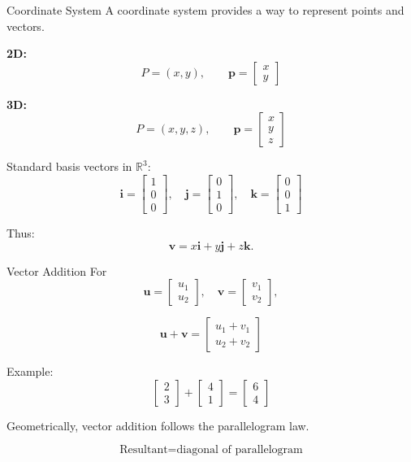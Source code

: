 \documentclass[aspectratio=169]{beamer}
\begin{document}
\begin{frame}{Coordinate System}
A coordinate system provides a way to represent points and vectors.

\textbf{2D:}
\[
P=(x,y),\qquad
\mathbf p=\begin{bmatrix}x\\y\end{bmatrix}
\]

\textbf{3D:}
\[
P=(x,y,z),\qquad
\mathbf p=
\begin{bmatrix}x\\y\\z\end{bmatrix}
\]

Standard basis vectors in $\mathbb R^3$:
\[
\mathbf i=\begin{bmatrix}1\\0\\0\end{bmatrix},
\quad
\mathbf j=\begin{bmatrix}0\\1\\0\end{bmatrix},
\quad
\mathbf k=\begin{bmatrix}0\\0\\1\end{bmatrix}
\]

Thus:
\[
\mathbf v=x\mathbf i+y\mathbf j+z\mathbf k.
\]
\end{frame}

\begin{frame}{Vector Addition}
For
\[
\mathbf u=\begin{bmatrix}u_1\\u_2\end{bmatrix},
\quad
\mathbf v=\begin{bmatrix}v_1\\v_2\end{bmatrix},
\]

\[
\mathbf u+\mathbf v=
\begin{bmatrix}
u_1+v_1\\u_2+v_2
\end{bmatrix}
\]

Example:
\[
\begin{bmatrix}2\\3\end{bmatrix}
+
\begin{bmatrix}4\\1\end{bmatrix}
=
\begin{bmatrix}6\\4\end{bmatrix}
\]

Geometrically, vector addition follows the parallelogram law.

\[
\boxed{\text{Resultant}=\text{diagonal of parallelogram}}
\]
\end{frame}
\end{document}
